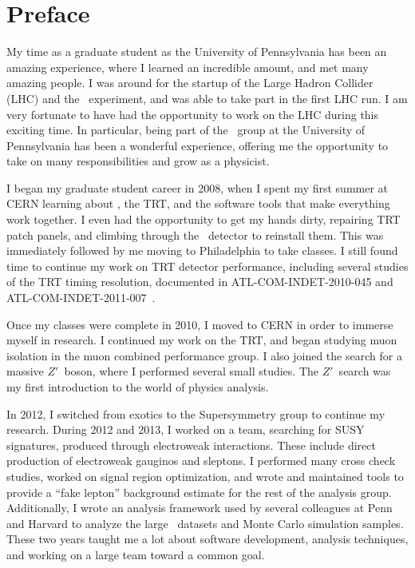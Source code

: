 
\chapter*{Preface}

My time as a graduate student as the University of Pennsylvania has been an
amazing experience, where I learned an incredible amount, and met many amazing
people.
I was around for the startup of the Large Hadron Collider (LHC) and the
\atlas\ experiment, and was able to take part in the first LHC run.
I am very fortunate to have had the opportunity to work on the LHC during this
exciting time.
In particular, being part of the \atlas\ group at the University of Pennsylvania
has been a wonderful experience, offering me the opportunity to take on
many responsibilities and grow as a physicist.

I began my graduate student career in 2008, when I spent my first summer at
CERN learning about \atlas, the TRT, and the software tools that make
everything work together.
I even had the opportunity to get my hands dirty, repairing TRT patch panels,
and climbing through the \atlas\ detector to reinstall them.
This was immediately followed by me moving to Philadelphia to take classes.
I still found time to continue my work on TRT detector performance, including
several studies of the TRT timing resolution, documented in
ATL-COM-INDET-2010-045 and
ATL-COM-INDET-2011-007~\cite{Cornelissen:1255892,Fratina:1340946}.

Once my classes were complete in 2010, I moved to CERN in order to immerse
myself in research.
I continued my work on the TRT, and began studying muon isolation in the muon
combined performance group.
I also joined the search for a massive $Z'$~boson, where I performed several
small studies.
The $Z'$~search was my first introduction to the world of physics analysis.

In 2012, I switched from exotics to the Supersymmetry group to continue my
research.
During 2012 and 2013, I worked on a team, searching for SUSY signatures,
produced through electroweak interactions.
These include direct production of electroweak gauginos and sleptons.
I performed many cross check studies, worked on signal region optimization,
and wrote and maintained tools to provide a ``fake lepton'' background
estimate for the rest of the analysis group.
Additionally, I wrote an analysis framework used by several colleagues at Penn
and Harvard to analyze the large \atlas\ datasets and Monte Carlo simulation
samples.
These two years taught me a lot about software development, analysis
techniques, and working on a large team toward a common goal.

